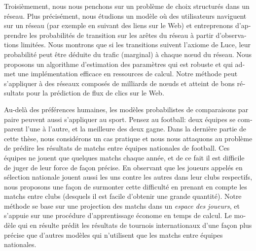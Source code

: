 \begin{otherlanguage}{french}
Troisièmement, nous nous penchons sur un problème de choix structurés dans un réseau.
Plus précisément, nous étudions un modèle où des utilisateurs naviguent sur un réseau (par exemple en suivant des liens sur le Web) et entreprenons d'apprendre les probabilités de transition sur les arêtes du réseau à partir d'observations limitées.
Nous montrons que si les transitions suivent l'axiome de Luce, leur probabilité peut être déduite du trafic (marginal) à chaque nœud du réseau.
Nous proposons un algorithme d'estimation des paramètres qui est robuste et qui admet une implémentation efficace en ressources de calcul.
Notre méthode peut s'appliquer à des réseaux composés de milliards de nœuds et atteint de bons résultats pour la prédiction de flux de clics sur le Web.

Au-delà des préférences humaines, les modèles probabilistes de comparaisons par paire peuvent aussi s'appliquer au sport.
Pensez au football: deux équipes se comparent l'une à l'autre, et la meilleure des deux gagne.
Dans la dernière partie de cette thèse, nous considérons un cas pratique et nous nous attaquons au problème de prédire les résultats de matchs entre équipes nationales de football.
Ces équipes ne jouent que quelques matchs chaque année, et de ce fait il est difficile de juger de leur force de façon précise.
En observant que les joueurs appelés en sélection nationale jouent aussi les uns contre les autres dans leur clubs respectifs, nous proposons une façon de surmonter cette difficulté en prenant en compte les matchs entre clubs (desquels il est facile d'obtenir une grande quantité).
Notre méthode se base sur une projection des matchs dans un \emph{espace des joueurs}, et s'appuie sur une procédure d'apprentissage économe en temps de calcul.
Le modèle qui en résulte prédit les résultats de tournois internationaux d'une façon plus précise que d'autres modèles qui n'utilisent que les matchs entre équipes nationales.
\end{otherlanguage}

